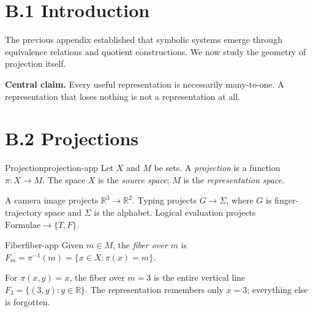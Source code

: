 
\section*{B.1 Introduction}

The previous appendix established that symbolic systems emerge through
equivalence relations and quotient constructions. We now study the geometry
of projection itself.

\begin{tcolorbox}[enhanced, colback=RSVPdeep, colframe=RSVPdeep,
  coltext=white, arc=6pt, boxrule=0pt, left=6mm, right=6mm, top=5mm, bottom=5mm]
  \textbf{Central claim.} Every useful representation is necessarily
  many-to-one. A representation that loses nothing is not a representation
  at all.
\end{tcolorbox}

\section*{B.2 Projections}

\begin{definition}{Projection}{projection-app}
  Let $X$ and $M$ be sets. A \emph{projection} is a function
  $\pi : X \to M$. The space $X$ is the \emph{source space};
  $M$ is the \emph{representation space}.
\end{definition}

\begin{example}
  A camera image projects $\mathbb{R}^3 \to \mathbb{R}^2$.
  Typing projects $G \to \Sigma$, where $G$ is finger-trajectory space
  and $\Sigma$ is the alphabet. Logical evaluation projects
  $\text{Formulae} \to \{T,F\}$.
\end{example}

\begin{definition}{Fiber}{fiber-app}
  Given $m \in M$, the \emph{fiber over $m$} is
  $F_m = \pi^{-1}(m) = \{x \in X : \pi(x) = m\}$.
\end{definition}

\begin{example}
  For $\pi(x,y) = x$, the fiber over $m = 3$ is the entire vertical line
  $F_3 = \{(3,y) : y \in \mathbb{R}\}$. The representation remembers only
  $x = 3$; everything else is forgotten.
\end{example}


